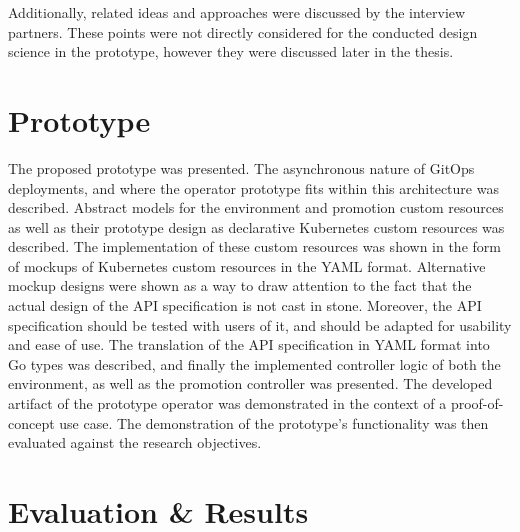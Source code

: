 Additionally,
related ideas and approaches were discussed by the interview partners.
These points were not directly considered for the conducted design science in the prototype,
however they were discussed later in the thesis.

\section*{Prototype}

The proposed prototype was presented.
The asynchronous nature of GitOps deployments, and where
the operator prototype fits within this architecture was described.
Abstract models for the environment and promotion custom resources as well as their prototype
design as declarative Kubernetes custom resources was described.
The implementation of these custom resources was shown in the form of mockups
of Kubernetes custom resources in the YAML format.
Alternative mockup designs were shown as a way to draw attention to the fact
that the actual design of the API specification is not cast in stone.
Moreover, the API specification should be tested with users of it,
and should be adapted for usability and ease of use.
The translation of the API specification in YAML format into Go types was described,
and finally the implemented controller logic of both the environment, as well as
the promotion controller was presented.
The developed artifact of the prototype operator was
demonstrated in the context of a proof-of-concept use case.
The demonstration of the prototype's functionality was then evaluated against
the research objectives.

\section*{Evaluation \& Results}

